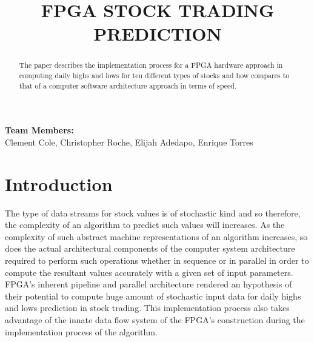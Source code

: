 \documentclass{sig-alternate}
\title{FPGA STOCK TRADING PREDICTION}
\begin{document}
	\maketitle
	\thispagestyle{firstpage}
	\pagestyle{plain}
		\begin{center}
			{\Large\bfseries Team Members:}\\[5pt] 
			Clement Cole, Christopher Roche, Elijah Adedapo, Enrique Torres\\[14pt]
		\end{center}
	
	
	
	
	\begin{abstract}
	The paper describes the implementation process for a FPGA hardware approach in computing daily highs and lows for ten different types of stocks and how compares to that of a computer software architecture approach in terms of speed. 
	\end{abstract}
	
	\section{Introduction}
	  The type of data streams for stock values is of stochastic kind and so therefore, the complexity of an algorithm to predict such values will increases. As the complexity of such abstract machine representations of an algorithm increases, so does the actual architectural components of the computer system architecture required to perform such operations whether in sequence or in parallel in order to compute the resultant values accurately with a given set of input parameters. FPGA's inherent pipeline and parallel architecture rendered an hypothesis of their potential to compute huge amount of stochastic input data for daily highs and lows prediction in stock trading. This implementation process also takes advantage of the innate data flow system of the FPGA's construction during the implementation process of the algorithm.
\end{document}
